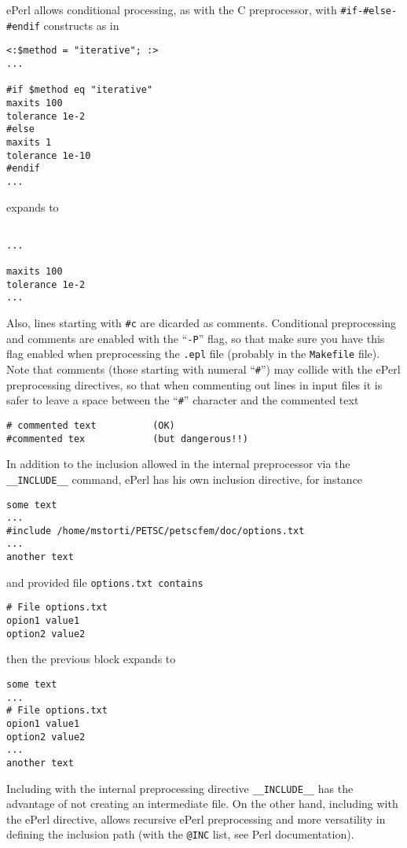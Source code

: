 
%
ePerl allows conditional processing, as with the C preprocessor, with
\verb+#if-#else-#endif+ constructs as in
%
\begin{verbatim}
<:$method = "iterative"; :>
...

#if $method eq "iterative"
maxits 100
tolerance 1e-2
#else
maxits 1
tolerance 1e-10
#endif
...
\end{verbatim}
%
expands to
%
\begin{verbatim}

...

maxits 100
tolerance 1e-2
...
\end{verbatim}

Also, lines starting with \verb+#c+ are dicarded as
comments. Conditional preprocessing and comments are enabled with the
``\verb+-P+'' flag, so that make sure you have this flag enabled when
preprocessing the \verb+.epl+ file (probably in the \verb+Makefile+
file). Note that \pfem{} comments (those starting with numeral
``\verb+#+'') may collide with the ePerl preprocessing directives, so
that when commenting out lines in \pfem{} input files it is safer to
leave a space between the ``\verb+#+'' character and the commented
text

\begin{verbatim}
# commented text          (OK)
#commented tex            (but dangerous!!)
\end{verbatim}


%
In addition to the inclusion allowed in the internal preprocessor via
the \verb+__INCLUDE__+ command, ePerl has his own inclusion directive,
for instance
%
\begin{verbatim}
some text
...
#include /home/mstorti/PETSC/petscfem/doc/options.txt
...
another text
\end{verbatim}
%
and provided file \verb+options.txt contains+ 
%
\begin{verbatim}
# File options.txt
opion1 value1
option2 value2
\end{verbatim}
%
then the previous block expands to
%
\begin{verbatim}
some text
...
# File options.txt
opion1 value1
option2 value2
...
another text
\end{verbatim}
%
Including with the internal preprocessing directive \verb+__INCLUDE__+
has the advantage of not creating an intermediate file. On the other
hand, including with the ePerl directive, allows recursive ePerl
preprocessing and more versatility in defining the inclusion path
(with the \verb+@INC+ list, see Perl documentation). 

